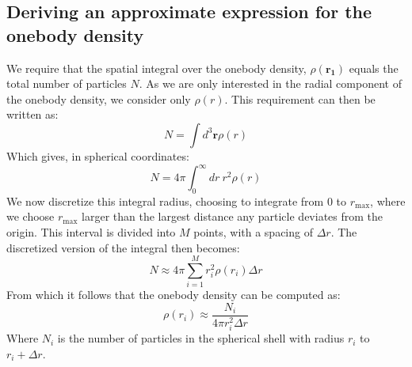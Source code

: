 \documentclass[a4paper, 10pt]{article}
\begin{document}
\begin{appendices}
		\section{Deriving an approximate expression for the onebody density}\label{ap:approximte_onebody_density}
		We require that the spatial integral over the onebody density, $\rho(\boldsymbol{r_1})$ equals the total number of particles $N$. As we are only interested in the radial component of the onebody density, we consider only $\rho(r)$. This requirement can then be written as:
		\begin{equation}
		N=\int d^3 \boldsymbol{r} \rho(r)
		\end{equation} 
		Which gives, in spherical coordinates:
		\begin{equation}
		N=4\pi \int_0^{\infty}dr\  r^2 \rho(r)
		\end{equation}
		We now discretize this integral radius, choosing to integrate from $0$ to $r_{\mathrm{max}}$, where we choose $r_{\mathrm{max}}$ larger than the largest distance any particle deviates from the origin. This interval is divided into $M$ points, with a spacing of $\Delta r$. The discretized version of the integral then becomes:
		\begin{equation}
		N\approx 4\pi \sum_{i=1}^M r_i^2 \rho(r_i) \Delta r
		\end{equation}
		From which it follows that the onebody density can be computed as:
		\begin{equation}
		\rho(r_i)\approx \frac{N_i}{4\pi r_i^2 \Delta r}
		\end{equation}
		Where $N_i$ is the number of particles in the spherical shell with radius $r_i$ to $r_i+\Delta r$.

\end{appendices}
\end{document}
